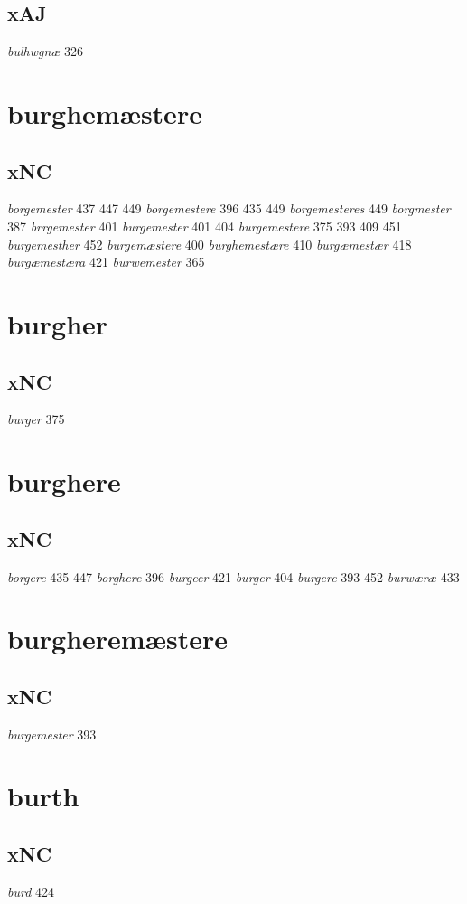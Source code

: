 \documentclass[a4paper,twocolumn]{article}
\begin{document}
\subsection{xAJ}
\label{sec:orgc6c2617}
\emph{bulhwgnæ} 326 
\section{burghemæstere}
\label{sec:orgf491bf8}
\subsection{xNC}
\label{sec:orgef22238}
\emph{borgemester} 437 447 449 \emph{borgemestere} 396 435 449 \emph{borgemesteres} 449 \emph{borgmester} 387 \emph{brrgemester} 401 \emph{burgemester} 401 404 \emph{burgemestere} 375 393 409 451 \emph{burgemesther} 452 \emph{burgemæstere} 400 \emph{burghemestære} 410 \emph{burgæmestær} 418 \emph{burgæmestæra} 421 \emph{burwemester} 365 
\section{burgher}
\label{sec:org432f88a}
\subsection{xNC}
\label{sec:org9935014}
\emph{burger} 375 
\section{burghere}
\label{sec:org1b9a075}
\subsection{xNC}
\label{sec:org33be652}
\emph{borgere} 435 447 \emph{borghere} 396 \emph{burgeer} 421 \emph{burger} 404 \emph{burgere} 393 452 \emph{burwæræ} 433 
\section{burgheremæstere}
\label{sec:orga3cbfa7}
\subsection{xNC}
\label{sec:org9481e6d}
\emph{burgemester} 393 
\section{burth}
\label{sec:org3f51365}
\subsection{xNC}
\label{sec:org95eb13e}
\emph{burd} 424 
\end{document}
